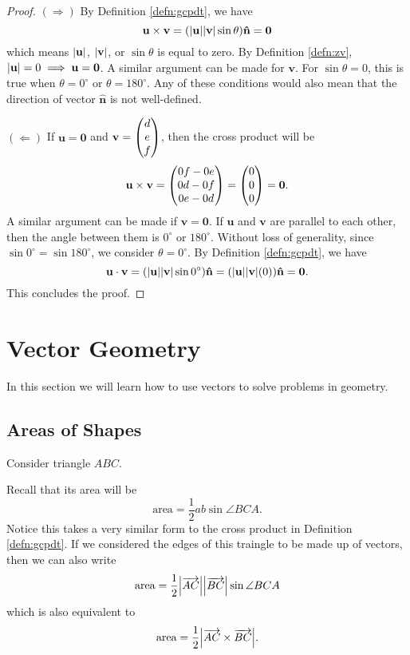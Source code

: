 \documentclass[12pt]{article}
\renewcommand{\vec}{\mathbf}
\begin{document}
\begin{proof}
	\((\Rightarrow)\) By Definition \ref{defn:gcpdt}, we have
	\[ \vec{u} \times \vec{v} = (\abs{\vec{u}} \abs{\vec{v}} \sin \theta) \vec{\hat{n}} = \vec{0} \] 
	which means \(\abs{\vec{u}}\), \(\abs{\vec{v}}\), or \(\sin \theta\) is equal to zero.
	By Definition \ref{defn:zv}, \(\abs{\vec{u}} = 0 \implies \vec{u} = \vec{0}\). 
	A similar argument can be made for \(\vec{v}\).
	For \(\sin \theta = 0\), this is true when \(\theta = 0^\circ\) or \(\theta = 180^\circ\).
	Any of these conditions would also mean that the direction of vector \(\vec{\hat{n}}\) is not well-defined.

	\((\Leftarrow)\) If \(\vec{u} = \vec{0}\) and \(\vec{v} = \cvec{d \\ e \\ f}\), then the cross product will be 
	\[ \vec{u} \times \vec{v} = \cvec{0f - 0e \\ 0d - 0f \\ 0e - 0d} = \cvec{0 \\ 0 \\ 0} = \vec{0}.  \] 
	A similar argument can be made if \(\vec{v} = \vec{0}\).
	If \(\vec{u}\) and \(\vec{v}\) are parallel to each other, then the angle between them is \(0^\circ\) or \(180^\circ\).
	Without loss of generality, since \(\sin 0^\circ = \sin 180^\circ\), we consider \(\theta = 0^\circ\). 
	By Definition \ref{defn:gcpdt}, we have 
	\[ \vec{u} \cdot \vec{v} = ( \abs{\vec{u}} \abs{\vec{v}} \sin 0^\circ ) \vec{\hat{n}} = ( \abs{\vec{u}} \abs{\vec{v}} (0) ) \vec{\hat{n}} = \vec{0}. \] 
	This concludes the proof.
\end{proof}


\section{Vector Geometry}
In this section we will learn how to use vectors to solve problems in geometry.

\subsection{Areas of Shapes}
\begin{disc}
	Consider triangle \(ABC\).
	\begin{figure}[H]
		\centering
	\end{figure}
	Recall that its area will be 
	\[ \text{area} = \frac{1}{2} a b \sin \angle BCA. \] 
	Notice this takes a very similar form to the cross product in Definition \ref{defn:gcpdt}.
	If we considered the edges of this traingle to be made up of vectors, then we can also write
	\[ \text{area} = \frac{1}{2} \abs*{\overrightarrow{AC}} \abs*{\overrightarrow{BC}} \sin \angle BCA \] 
	which is also equivalent to
	\[ \text{area} = \frac{1}{2} \abs*{\overrightarrow{AC} \times \overrightarrow{BC}}. \] 
\end{disc}
\end{document}

